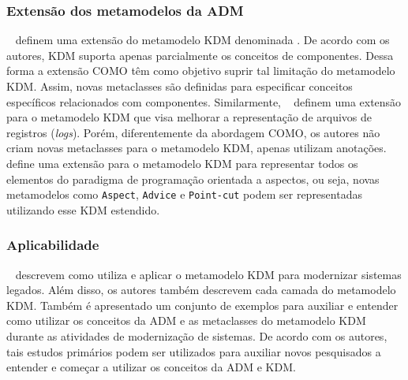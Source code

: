\subsubsection{Extensão dos metamodelos da ADM} %
\label{ssub:extension_of_adm_s_metamodels}

~ definem uma extensão do metamodelo KDM denominada . De acordo com os autores, KDM suporta apenas parcialmente os conceitos de componentes. Dessa forma a extensão COMO têm como objetivo suprir tal limitação do metamodelo KDM. Assim, novas metaclasses são definidas para especificar conceitos específicos relacionados com componentes. Similarmente, ~ definem uma extensão para o metamodelo KDM que visa melhorar a representação de arquivos de registros (\textit{logs}). Porém, diferentemente da abordagem COMO, os autores não criam novas metaclasses para o metamodelo KDM, apenas utilizam anotações. ~ define uma extensão para o metamodelo KDM para representar todos os elementos do paradigma de programação orientada a aspectos, ou seja, novas metamodelos como \texttt{Aspect}, \texttt{Advice} e \texttt{Point-cut} podem ser representadas utilizando esse KDM estendido.


\subsubsection{Aplicabilidade} %
\label{ssub:applicability}


~ descrevem como utiliza e aplicar  o metamodelo KDM para modernizar sistemas legados. Além disso, os autores também descrevem cada camada do metamodelo KDM. Também é apresentado um conjunto de exemplos para auxiliar e entender como utilizar os conceitos da ADM e as metaclasses do metamodelo KDM durante as atividades de modernização de sistemas. De acordo com os autores, tais estudos primários podem ser utilizados para auxiliar novos pesquisados a entender e começar a utilizar os conceitos da ADM e KDM.


